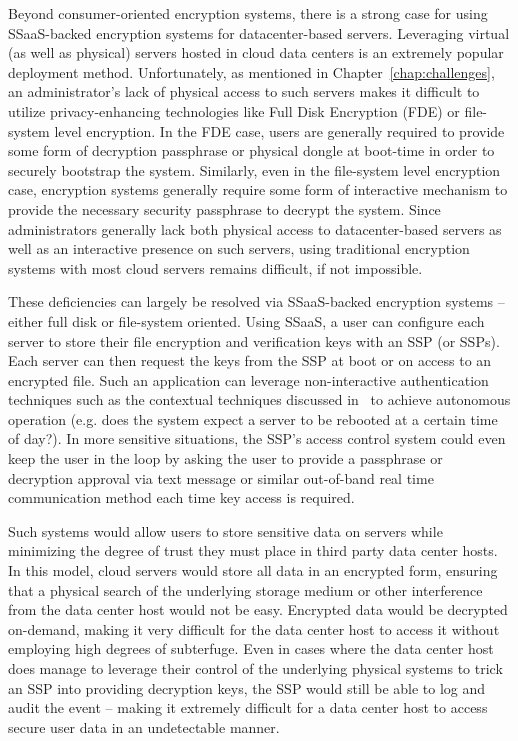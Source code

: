 Beyond consumer-oriented encryption systems, there is a strong case
for using SSaaS-backed encryption systems for datacenter-based
servers. Leveraging virtual (as well as physical) servers hosted in
cloud data centers is an extremely popular deployment
method. Unfortunately, as mentioned in Chapter~\ref{chap:challenges},
an administrator's lack of physical access to such servers makes it
difficult to utilize privacy-enhancing technologies like Full Disk
Encryption (FDE) or file-system level encryption. In the FDE case,
users are generally required to provide some form of decryption
passphrase or physical dongle at boot-time in order to securely
bootstrap the system. Similarly, even in the file-system level
encryption case, encryption systems generally require some form of
interactive mechanism to provide the necessary security passphrase to
decrypt the system. Since administrators generally lack both physical
access to datacenter-based servers as well as an interactive presence
on such servers, using traditional encryption systems with most cloud
servers remains difficult, if not impossible.

These deficiencies can largely be resolved via SSaaS-backed encryption
systems -- either full disk or file-system oriented. Using SSaaS, a
user can configure each server to store their file encryption and
verification keys with an SSP (or SSPs). Each server can then request
the keys from the SSP at boot or on access to an encrypted file. Such
an application can leverage non-interactive authentication techniques
such as the contextual techniques discussed in~\cite{hulsebosch2005}
to achieve autonomous operation (e.g. does the system expect a server
to be rebooted at a certain time of day?). In more sensitive
situations, the SSP's access control system could even keep the user
in the loop by asking the user to provide a passphrase or decryption
approval via text message or similar out-of-band real time
communication method each time key access is required.

Such systems would allow users to store sensitive data on servers
while minimizing the degree of trust they must place in third party
data center hosts. In this model, cloud servers would store all data
in an encrypted form, ensuring that a physical search of the
underlying storage medium or other interference from the data center
host would not be easy. Encrypted data would be decrypted on-demand,
making it very difficult for the data center host to access it without
employing high degrees of subterfuge. Even in cases where the data
center host does manage to leverage their control of the underlying
physical systems to trick an SSP into providing decryption keys, the
SSP would still be able to log and audit the event -- making it
extremely difficult for a data center host to access secure user data
in an undetectable manner.

